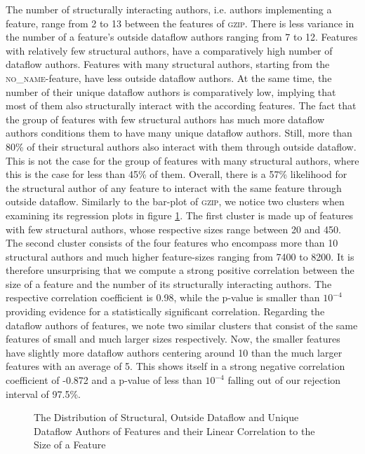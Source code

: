 The number of structurally interacting authors, i.e. authors implementing a feature, range from 2 to 13 between the features of \textsc{gzip}.
There is less variance in the number of a feature's outside dataflow authors ranging from 7 to 12.
Features with relatively few structural authors, have a comparatively high number of dataflow authors.
Features with many structural authors, starting from the \textsc{no\_name}-feature, have less outside dataflow authors.
At the same time, the number of their unique dataflow authors is comparatively low, implying that most of them also structurally interact with the according features.
The fact that the group of features with few structural authors has much more dataflow authors conditions them to have many unique dataflow authors.
Still, more than 80\% of their structural authors also interact with them through outside dataflow.
This is not the case for the group of features with many structural authors, where this is the case for less than 45\% of them.
Overall, there is a 57\% likelihood for the structural author of any feature to interact with the same feature through outside dataflow.
Similarly to the bar-plot of \textsc{gzip}, we notice two clusters when examining its regression plots in figure \ref{fig:author_cfi_plot}.
The first cluster is made up of features with few structural authors, whose respective sizes range between 20 and 450.
The second cluster consists of the four features who encompass more than 10 structural authors and much higher feature-sizes ranging from 7400 to 8200.
It is therefore unsurprising that we compute a strong positive correlation between the size of a feature and the number of its structurally interacting authors.
The respective correlation coefficient is 0.98, while the p-value is smaller than $10^{-4}$ providing evidence for a statistically significant correlation.
Regarding the dataflow authors of features, we note two similar clusters that consist of the same features of small and much larger sizes respectively.
Now, the smaller features have slightly more dataflow authors centering around 10 than the much larger features with an average of 5.
This shows itself in a strong negative correlation coefficient of -0.872 and a p-value of less than $10^{-4}$ falling out of our rejection interval of 97.5\%.

\begin{figure}[htbp]
  \centering
  
  \caption{The Distribution of Structural, Outside Dataflow and Unique Dataflow Authors of Features and their Linear Correlation to the Size of a Feature}
  \label{fig:author_cfi_plot}
\end{figure}

